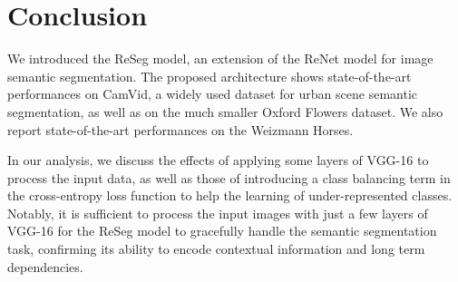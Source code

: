 \section{Conclusion}
We introduced the ReSeg model, an extension of the ReNet model for image
semantic segmentation. The proposed architecture shows state-of-the-art
performances on CamVid, a widely used dataset for urban scene semantic
segmentation, as well as on the much smaller Oxford Flowers dataset. We also
report state-of-the-art performances on the Weizmann Horses.

In our analysis, we discuss the effects of applying some layers of VGG-16 to
process the input data, as well as those of introducing a class balancing
term in the cross-entropy loss function to help the learning of
under-represented classes.
Notably, it is sufficient to process the input images with just a few layers of
VGG-16 for the ReSeg model to gracefully handle the semantic segmentation task, confirming
its ability to encode contextual information and long term dependencies.
